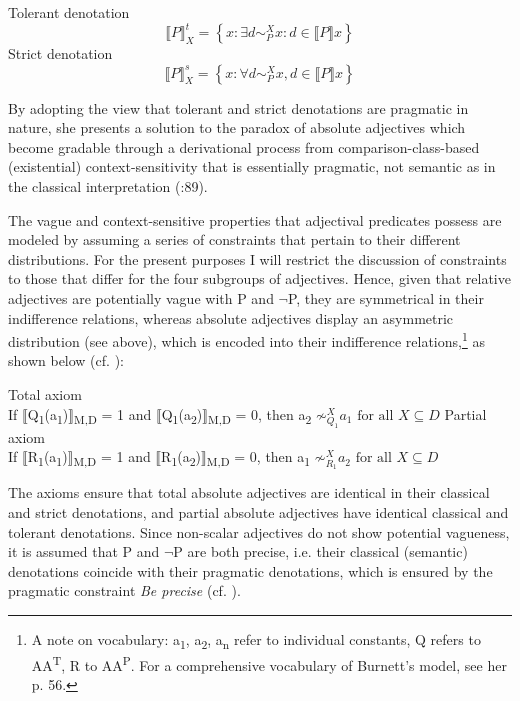 \documentclass[output=paper]{langsci/langscibook}
\begin{document}
\ea \label{ex:harris:22}
	Tolerant denotation \[ \llbracket P \rrbracket_X^t	= \left\{x : \exists d \sim_P^X  x : d \in \llbracket P\rrbracket x \right\}\]
\ex \label{ex:harris:23}
	Strict denotation \[\llbracket P\rrbracket_X^s  = \left\{  x :  \forall d \sim _P^X  x, d  \in   \llbracket P \rrbracket x  \right\}\]
\z

By adopting the view that tolerant and strict denotations are pragmatic in nature, she presents a solution to the paradox of absolute adjectives which become gradable through a derivational process from comparison-class-based (existential) context-sensitivity that is essentially pragmatic, not semantic as in the classical interpretation (\citeyear{Burnett2017}:89).

The vague and context-sensitive properties that adjectival predicates possess are modeled by assuming a series of constraints that pertain to their different distributions. For the present purposes I will restrict the discussion of constraints to those that differ for the four subgroups of adjectives. Hence, given that relative adjectives are potentially vague with P and $\neg$P, they are symmetrical in their indifference relations, whereas absolute adjectives display an asymmetric distribution (see above), which is encoded into their indifference relations,\footnote{A note on vocabulary: a\textsubscript{1}, a\textsubscript{2}, a\textsubscript{n} refer to individual constants, Q refers to AA\textsuperscript{T}, R to AA\textsuperscript{P}. For a comprehensive vocabulary of Burnett's model, see her p. 56.} as shown below (cf. \citealt[77]{Burnett2017}):

\ea
	Total axiom\\
	If $\llbracket$Q\textsubscript{1}(a\textsubscript{1})$\rrbracket$\textsubscript{M,D} = 1 and $\llbracket$Q\textsubscript{1}(a\textsubscript{2})$\rrbracket$\textsubscript{M,D} = 0, then a\textsubscript{2} $ \not\sim_{Q_{1}}^X  a_{1} \text{ for all }  X \subseteq D$
\ex
	Partial axiom\\
	If $\llbracket$R\textsubscript{1}(a\textsubscript{1})$\rrbracket$\textsubscript{M,D} = 1 and $\llbracket$R\textsubscript{1}(a\textsubscript{2})$\rrbracket$\textsubscript{M,D} = 0, then a\textsubscript{1} $ \not\sim_{R_{1}}^X  a_{2} \text{ for all } X \subseteq D$
\z

The axioms ensure that total absolute adjectives are identical in their classical and strict denotations, and partial absolute adjectives have identical classical and tolerant denotations. Since non-scalar adjectives do not show potential vagueness, it is assumed that P and $\neg$P are both precise, i.e. their classical (semantic) denotations coincide with their pragmatic denotations, which is ensured by the pragmatic constraint \textit{Be precise} (cf. \citealt[77--78]{Burnett2017}).
\end{document}
